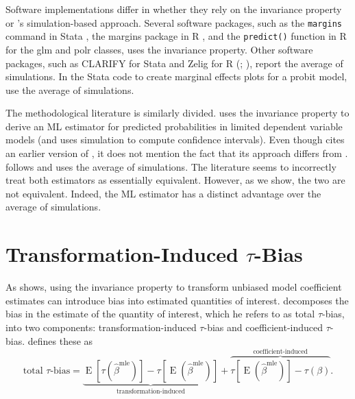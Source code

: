 \documentclass[11pt]{article}
\DeclareMathOperator*{\E}{\text{E}}
\begin{document}
Software implementations differ in whether they rely on the invariance property or \cite{KingTomzWittenberg2000}'s simulation-based approach. Several software packages, such as the \texttt{margins} command in Stata \citep{StataManual}, the margins package in R \citep{margins}, and the \texttt{predict()} function in R for the glm \citep{R} and polr \citep{MASS} classes, uses the invariance property. Other software packages, such as CLARIFY for Stata \citep{TomzWittenbergKing2003} and Zelig for R (\citealt{ImaiKingLau2008}; \citealt{Choiratetal}), report the average of simulations. In the Stata code to create marginal effects plots for a probit model, \cite{BramborClarkGolder2006} use the average of simulations.

The methodological literature is similarly divided. \cite{Herron1999} uses the invariance property to derive an ML estimator for predicted probabilities in limited dependent variable models (and uses simulation to compute confidence intervals). Even though \cite{Herron1999} cites an earlier version of \cite{KingTomzWittenberg2000}, it does not mention the fact that its approach differs from \cite{KingTomzWittenberg2000}. \cite{CarseyHarden2013} follows \cite{KingTomzWittenberg2000} and uses the average of simulations. The literature seems to incorrectly treat both estimators as essentially equivalent. However, as we show, the two are not equivalent. Indeed, the ML estimator has a distinct advantage over the average of simulations.

\section*{Transformation-Induced $\tau$-Bias}

As \citet{Rainey2017} shows, using the invariance property to transform unbiased model coefficient estimates can introduce bias into estimated quantities of interest. \citet[p.\@ 404]{Rainey2017} decomposes the bias in the estimate of the quantity of interest, which he refers to as {total $\tau$-bias,} into two components: transformation-induced $\tau$-bias and coefficient-induced $\tau$-bias. \citet{Rainey2017} defines these as
\begin{equation}
\text{total } \tau\text{-bias}= \underbrace{ \E\left[\tau\left(\hat{\beta}^\text{mle}\right)\right]-  \tau\left[\E\left(\hat{\beta}^\text{mle}\right)\right]  }_{\text{transformation-induced}} + \overbrace{  \tau\left[\E\left(\hat{\beta}^\text{mle}\right)\right] - \tau\left(\beta\right)  }^{\text{coefficient-induced}}\text{.} \label{eqn:ti-bias}
\end{equation}
\end{document}
